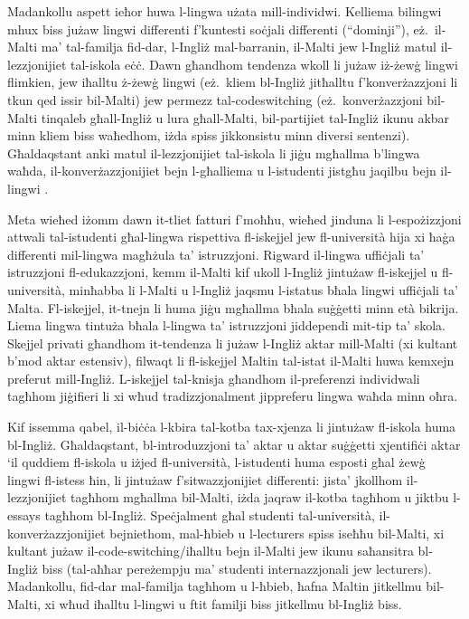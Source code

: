 \begin{multicols}{2}
Madankollu aspett ieħor huwa l-lingwa użata mill-individwi. Kelliema bilingwi mhux biss jużaw lingwi differenti f'kuntesti soċjali differenti (``dominji''), eż.~il-Malti ma’ tal-familja fid-dar, l-Ingliż mal-barranin, il-Malti jew l-Ingliż matul il-lezzjonijiet tal-iskola eċċ. Dawn għandhom tendenza wkoll li jużaw iż-żewġ lingwi flimkien, jew iħalltu ż-żewġ lingwi (eż.~kliem bl-Ingliż jitħalltu f’konverżazzjoni li tkun qed issir bil-Malti) jew permezz tal-codeswitching (eż.~konverżazzjoni bil-Malti tinqaleb għall-Ingliż u lura għall-Malti, bil-partijiet tal-Ingliż ikunu akbar minn kliem biss waħedhom, iżda spiss jikkonsistu minn diversi sentenzi). Għaldaqstant anki matul il-lezzjonijiet tal-iskola li jiġu mgħallma b’lingwa waħda, il-konverżazzjonijiet bejn l-għalliema u l-istudenti jistgħu jaqilbu bejn il-lingwi \cite{Camilleri:1995}.

Meta wieħed iżomm dawn it-tliet fatturi f’moħħu, wieħed jinduna  li l-espożizzjoni attwali tal-istudenti għal-lingwa rispettiva fl-iskejjel jew fl-università hija xi ħaġa differenti mil-lingwa magħżula ta’ istruzzjoni.
Rigward il-lingwa uffiċjali ta’ istruzzjoni fl-edukazzjoni, kemm il-Malti kif ukoll l-Ingliż jintużaw fl-iskejjel u fl-università, minħabba li l-Malti u l-Ingliż jaqsmu l-istatus bħala lingwi uffiċjali ta’ Malta. Fl-iskejjel, it-tnejn li huma jiġu mgħallma bħala suġġetti minn età bikrija. Liema lingwa tintuża bħala l-lingwa ta’ istruzzjoni jiddependi mit-tip ta’ skola. Skejjel privati għandhom it-tendenza li jużaw l-Ingliż aktar mill-Malti (xi kultant b’mod aktar estensiv), filwaqt li fl-iskejjel Maltin tal-istat il-Malti huwa kemxejn preferut mill-Ingliż. L-iskejjel tal-knisja għandhom il-preferenzi individwali tagħhom jiġifieri li xi wħud tradizzjonalment jippreferu lingwa waħda minn oħra.
\columnbreak

Kif issemma qabel, il-biċċa l-kbira tal-kotba tax-xjenza li jintużaw fl-iskola huma bl-Ingliż. Għaldaqstant, bl-introduzzjoni ta’ aktar u aktar suġġetti xjentifiċi aktar ‘il quddiem fl-iskola u iżjed fl-università, l-istudenti huma esposti għal żewġ lingwi fl-istess ħin, li jintużaw f'sitwazzjonijiet differenti: jista’ jkollhom il-lezzjonijiet tagħhom mgħallma bil-Malti, iżda jaqraw il-kotba tagħhom u jiktbu l-essays tagħhom bl-Ingliż. Speċjalment għal studenti tal-università, il-konverżazzjonijiet bejniethom, mal-ħbieb u l-lecturers spiss iseħħu bil-Malti, xi kultant jużaw il-code-switching/iħalltu bejn il-Malti jew ikunu saħansitra bl-Ingliż biss (tal-aħħar pereżempju ma’ studenti internazzjonali jew lecturers).
Madankollu, fid-dar mal-familja tagħhom u l-ħbieb, ħafna Maltin jitkellmu bil-Malti, xi wħud iħalltu l-lingwi u ftit familji biss jitkellmu bl-Ingliż biss.


\end{multicols}

